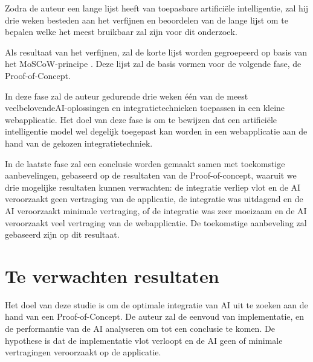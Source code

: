 \documentclass[dutch]{hogent-article}
\begin{document}
Zodra de auteur een lange lijst heeft van toepasbare artificiële intelligentie, zal hij drie weken besteden aan het verfijnen en beoordelen van de lange lijst om te bepalen welke het meest bruikbaar zal zijn voor dit onderzoek.

Als resultaat van het verfijnen, zal de korte lijst worden gegroepeerd op basis van het MoSCoW-principe \autocite{Nordenstam2014}. Deze lijst zal de basis vormen voor de volgende fase, de Proof-of-Concept.

In deze fase zal de auteur gedurende drie weken één van de meest veelbelovende\linebreak AI-oplossingen en integratietechnieken toepassen in een kleine webapplicatie. Het doel van deze fase is om te bewijzen dat een artificiële intelligentie model wel degelijk toegepast kan worden in een webapplicatie aan de hand van de gekozen integratietechniek.

In de laatste fase zal een conclusie worden gemaakt samen met toekomstige aanbevelingen, gebaseerd op de resultaten van de Proof-of-conc\-ept, waaruit we drie mogelijke resultaten kunnen verwachten: de integratie verliep vlot en de AI veroorzaakt geen vertraging van de applicatie, de integratie was uitdagend en de AI veroorzaakt minimale vertraging, of de integratie was zeer moeizaam en de AI veroorzaakt veel vertraging van de webapplicatie. De toekomstige aanbeveling zal gebaseerd zijn op dit resultaat.

\section{Te verwachten resultaten}%
\label{sec:expected-results}


Het doel van deze studie is om de optimale integratie van AI uit te zoeken aan de hand van een Proof-of-Concept. De auteur zal de eenvoud van implementatie, en de performantie van de AI analyseren om tot een conclusie te komen. De hypothese is dat de implementatie vlot verloopt en de AI geen of minimale vertragingen veroorzaakt op de applicatie.
\end{document}

